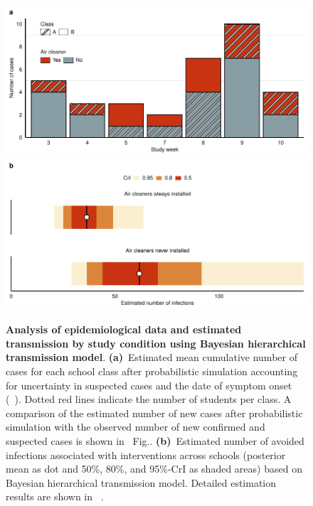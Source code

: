 \documentclass[fleqn,11pt]{wlscirep}
\begin{document}
{\begin{figure}[!htpb]
    \includegraphics[width=\linewidth]{../../results/epi-data/cases_by_week.pdf} 
    \includegraphics[width=\linewidth]{../../results/epi-data/avoided-infections.pdf}
    \caption{\textbf{Analysis of epidemiological data and estimated transmission by study condition using Bayesian hierarchical transmission model}. \textbf{(a)}~Estimated mean cumulative number of cases for each school class after probabilistic simulation accounting for uncertainty in suspected cases and the date of symptom onset (\supp~). Dotted red lines indicate the number of students per class. A comparison of the estimated number of new cases after probabilistic simulation with the observed number of new confirmed and suspected cases is shown in \supp~Fig.. \textbf{(b)}~Estimated number of avoided infections associated with interventions across schools (posterior mean as dot and 50\%, 80\%, and 95\%-CrI as shaded areas) based on Bayesian hierarchical transmission model. Detailed estimation results are shown in \supp~.}
    \label{fig:redcap-results}
\end{figure}


\FloatBarrier

}
\end{document}

